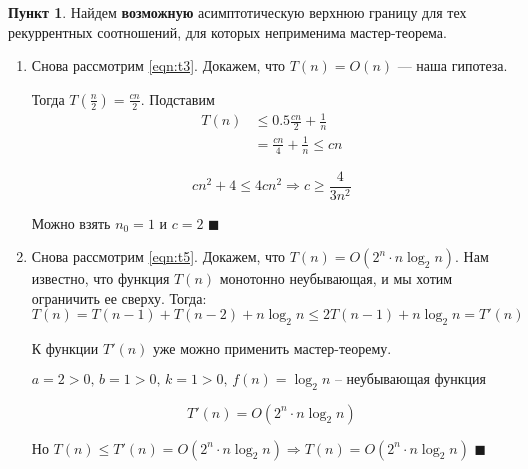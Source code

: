\documentclass[11pt,a4paper]{scrarticle}
\theoremstyle{definition}
\newtheorem{subtask}{Пункт}
\begin{document}
\begin{subtask}
	Найдем \textbf{возможную} асимптотическую верхнюю границу для тех рекуррентных соотношений, для которых неприменима мастер-теорема.

	\begin{enumerate}
		\item Снова рассмотрим \eqref{eqn:t3}. Докажем, что $T(n) = O(n)$ --- наша гипотеза.

		      Тогда $T\left(\frac{n}{2}\right) = \frac{cn}{2}$. Подставим
		      \begin{align*}
			      T(n) & \leq 0.5 \frac{cn}{2} + \frac{1}{n}  \\
			           & = \frac{cn}{4} + \frac{1}{n} \leq cn
		      \end{align*}

		      $$
			      cn^2 + 4 \leq 4cn^2 \Rightarrow
			      c \geq \frac{4}{3n^2}
		      $$

		      Можно взять $n_0 = 1$ и $c = 2$ $\blacksquare$
		      \pagebreak
		\item Снова рассмотрим \eqref{eqn:t5}. Докажем, что $T(n) = O(2^n \cdot n \log_2 n)$. Нам известно, что функция $T(n)$ монотонно неубывающая, и мы хотим ограничить ее сверху. Тогда:
		      $$
			      T(n) = T\left(n - 1\right) + T\left(n - 2\right) + n \log_2 n \leq
			      2 T\left(n - 1\right) + n \log_2 n = T'(n)
		      $$

		      К функции $T'(n)$ уже можно применить мастер-теорему.

		      $a = 2 > 0, \, b = 1 > 0, \, k = 1 > 0, \, f(n) = \log_2 n \text{ -- неубывающая функция}$

		      $$
			      T'(n) = O(2^n \cdot n \log_2 n)
		      $$

		      Но $T(n) \leq T'(n) = O(2^n \cdot n \log_2 n) \Longrightarrow T(n) = O(2^n \cdot n \log_2 n)$ $\blacksquare$
	\end{enumerate}
\end{subtask}
\end{document}
